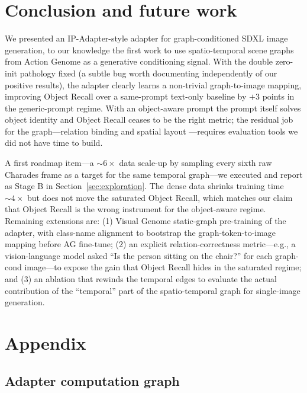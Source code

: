 \documentclass[11pt]{article}
\begin{document}
\section{Conclusion and future work}
\label{sec:future-work}
We presented an IP-Adapter-style adapter for graph-conditioned SDXL
image generation, to our knowledge the first work to use spatio-temporal
scene graphs from Action Genome as a generative conditioning signal.
With the double zero-init pathology fixed (a subtle bug worth
documenting independently of our positive results), the adapter
clearly learns a non-trivial graph-to-image mapping, improving Object
Recall over a same-prompt text-only baseline by $+3$ points in the
generic-prompt regime. With an object-aware prompt the prompt itself
solves object identity and Object Recall ceases to be the right metric;
the residual job for the graph---relation binding and spatial layout
---requires evaluation tools we did not have time to build.

A first roadmap item---a $\sim 6\!\times$ data scale-up by sampling
every sixth raw Charades frame as a target for the same temporal
graph---we executed and report as Stage B in
Section~\ref{sec:exploration}. The dense data shrinks training time
$\sim 4\!\times$ but does not move the saturated Object Recall, which
matches our claim that Object Recall is the wrong instrument for the
object-aware regime. Remaining extensions are: (1) Visual Genome
static-graph pre-training of the adapter, with class-name alignment
to bootstrap the graph-token-to-image mapping before AG fine-tune;
(2) an explicit relation-correctness metric---e.g., a vision-language
model asked ``Is the person sitting on the chair?'' for each
graph-cond image---to expose the gain that Object Recall hides in the
saturated regime; and (3) an ablation that rewinds the temporal edges
to evaluate the actual contribution of the ``temporal'' part of the
spatio-temporal graph for single-image generation.




\appendix
\section{Appendix}

\subsection{Adapter computation graph}
\end{document}
